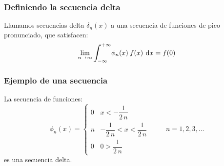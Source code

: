 \documentclass[12pt]{beamer}
\begin{document}
\begin{frame}
\frametitle{Definiendo la secuencia delta}
Llamamos secuencias delta $\delta_{n} (x)$ a una secuencia de funciones de pico pronunciado, que satisfacen:
\pause
\begin{align*}
\lim_{n \to \infty} \scaleint{6ex}_{\bs -\infty}^{+ \infty} \phi_{n} (x) \: f (x) \: \dd{x} =  f (0)
\end{align*}
\end{frame}

\begin{frame}
\frametitle{Ejemplo de una secuencia}
La secuencia de funciones:
\pause
\begin{equation}
\phi_{n} (x) = \begin{cases}
0 & x < - \dfrac{1}{2 \, n} \\
n & - \dfrac{1}{2 \, n} < x < \dfrac{1}{2 \, n} \\
0 & 0 >  \dfrac{1}{2 \, n}
\end{cases}
\hspace{1cm} n = 1, 2, 3, \ldots
\label{eq:ecuacion_delta_04}
\end{equation}
es una secuencia delta.
\end{frame}
\end{document}

